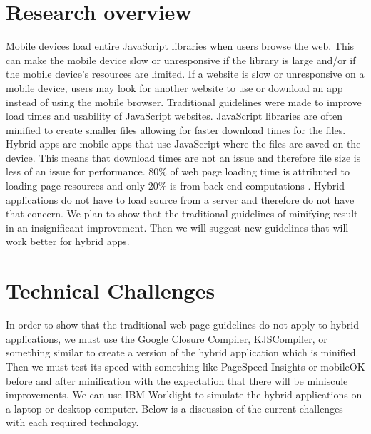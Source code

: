 \documentclass{acm_proc_article-sp}
\begin{document}
\maketitle




\section{Research overview}
Mobile devices load entire JavaScript libraries when users browse the web. This can make the mobile device slow or unresponsive if the library is large and/or if the mobile device’s resources are limited. If a website is slow or unresponsive on a mobile device, users may look for another website to use or download an app instead of using the mobile browser. Traditional guidelines were made to improve load times and usability of JavaScript websites. JavaScript libraries are often minified to create smaller files allowing for faster download times for the files. Hybrid apps are mobile apps that use JavaScript where the files are saved on the device. This means that download times are not an issue and therefore file size is less of an issue for performance. 80\% of web page loading time is attributed to loading page resources and only 20\% is from back-end computations \cite{souders2008high}. Hybrid applications do not have to load source from a server and therefore do not have that concern. We plan to show that the traditional guidelines of minifying result in an insignificant improvement. Then we will suggest new guidelines that will work better for hybrid apps.


\section{Technical Challenges}

In order to show that the traditional web page guidelines do not apply to hybrid applications, we must use the Google Closure Compiler, KJSCompiler, or something similar to create a version of the hybrid application which is minified. Then we must test its speed with something like PageSpeed Insights or mobileOK before and after minification with the expectation that there will be miniscule improvements. We can use IBM Worklight to simulate the hybrid applications on a laptop or desktop computer. Below is a discussion of the current challenges with each required technology.
\end{document}
